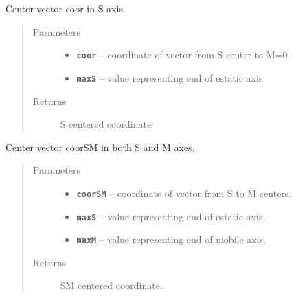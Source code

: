 \documentclass[letterpaper,10pt,english]{sphinxmanual}
\begin{document}

\begin{fulllineitems}
\label{RRtoolbox.lib.arrayops:RRtoolbox.lib.arrayops.basic.centerS}
Center vector coor in S axis.
\begin{quote}\begin{description}
\item[{Parameters}] \leavevmode\begin{itemize}
\item {} 
\textbf{\texttt{coor}} -- coordinate of vector from S center to M=0

\item {} 
\textbf{\texttt{maxS}} -- value representing end of estatic axis

\end{itemize}

\item[{Returns}] \leavevmode
S centered coordinate

\end{description}\end{quote}

\end{fulllineitems}


\begin{fulllineitems}
\label{RRtoolbox.lib.arrayops:RRtoolbox.lib.arrayops.basic.centerSM}
Center vector coorSM in both S and M axes.
\begin{quote}\begin{description}
\item[{Parameters}] \leavevmode\begin{itemize}
\item {} 
\textbf{\texttt{coorSM}} -- coordinate of vector from S to M centers.

\item {} 
\textbf{\texttt{maxS}} -- value representing end of estatic axis.

\item {} 
\textbf{\texttt{maxM}} -- value representing end of mobile axis.

\end{itemize}

\item[{Returns}] \leavevmode
SM centered coordinate.

\end{description}\end{quote}

\end{fulllineitems}
\end{document}
